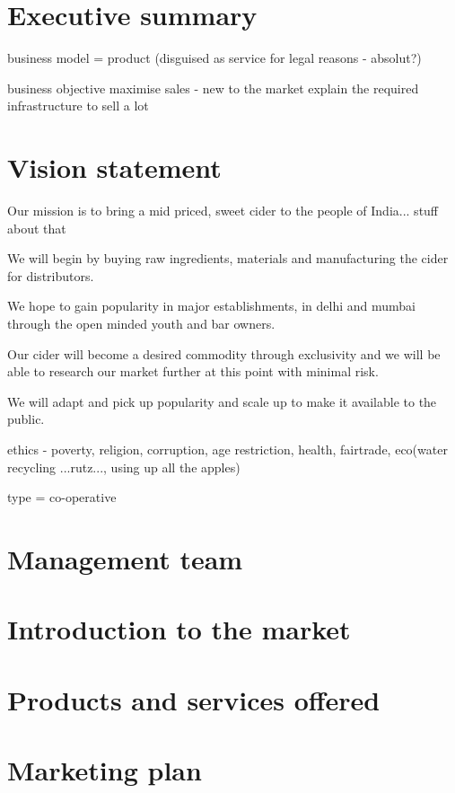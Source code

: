 \documentclass{article}
\begin{document}
\section{Executive summary}

business model = product (disguised as service for legal reasons - absolut?)

business objective 
maximise sales 
 - new to the market
   explain the required infrastructure to sell a lot 

\section{Vision statement}

Our mission is to bring a mid priced, sweet cider to the people of India... stuff
about that 

We will begin by buying raw ingredients, materials and manufacturing the cider
for distributors. 

We hope to gain popularity in major establishments, in delhi and mumbai through 
the open minded youth and bar owners.

Our cider will become a desired commodity through exclusivity and we will be
able to research our market further at this point with minimal risk.

We will adapt and pick up popularity and scale up to make it available to the
public. 

ethics - poverty, religion, corruption, age restriction, health, fairtrade,
eco(water recycling ...rutz..., using up all the apples)

type = co-operative

\section{Management team}

\section{Introduction to the market}
\section{Products and services offered}
\section{Marketing plan}
\end{document}

